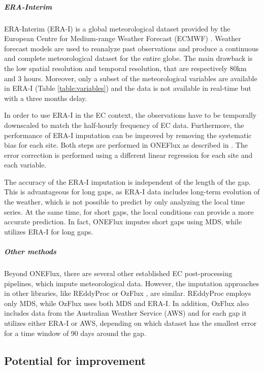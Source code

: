 \documentclass{article}
\let\Oldsubsection\subsection
\renewcommand{\subsection}{\FloatBarrier\Oldsubsection}
\begin{document}
\subparagraph{ERA-Interim} ERA-Interim (ERA-I) is a global meteorological dataset provided by the European Centre for Medium-range Weather Forecast (ECMWF) \cite{dee_era-interim_2011}. Weather forecast models are used to reanalyze past observations and produce a continuous and complete meteorological dataset  for the entire globe. The main drawback is the low spatial resolution and temporal resolution, that are respectively 80km and 3 hours. Moreover, only a subset of the meteorological variables are available in ERA-I (Table \ref{table:variables}) and the data is not available in real-time but with a three months delay.

In order to use ERA-I in the EC context, the observations have to be temporally downscaled to match the half-hourly frequency of EC data. Furthermore, the performance of ERA-I imputation can be improved by removing the systematic bias for each site. Both steps are performed in \textsf{ONEFlux} as described in \textcite{vuichard_filling_2015}. The error correction is performed using a different linear regression for each site and each variable.

The accuracy of the ERA-I imputation is independent of the length of the gap. This is advantageous for long gaps, as ERA-I data includes long-term evolution of the weather, which is not possible to predict by only analyzing the local time series. At the same time, for short gaps, the local conditions can provide a more  accurate prediction.
In fact, \textsf{ONEFlux} imputes short gaps using MDS, while utilizes ERA-I for long gaps.

\subparagraph{Other methods} Beyond \textsf{ONEFlux}, there are several other established EC post-processing pipelines, which impute meteorological data. However, the imputation approaches in other libraries, like \textsf{REddyProc} \cite{wutzler_basic_2018} or \textsf{OzFlux} \cite{isaac_ozflux_2017}, are similar. \textsf{REddyProc} employs only MDS, while \textsf{OzFlux} uses both MDS and ERA-I. In addition, \textsf{OzFlux} also includes data from the Australian Weather Service (AWS) and for each gap it utilizes either ERA-I or AWS, depending on which dataset has the smallest error for a time window of 90 days around the gap.

\subsection{Potential for improvement}
\end{document}
